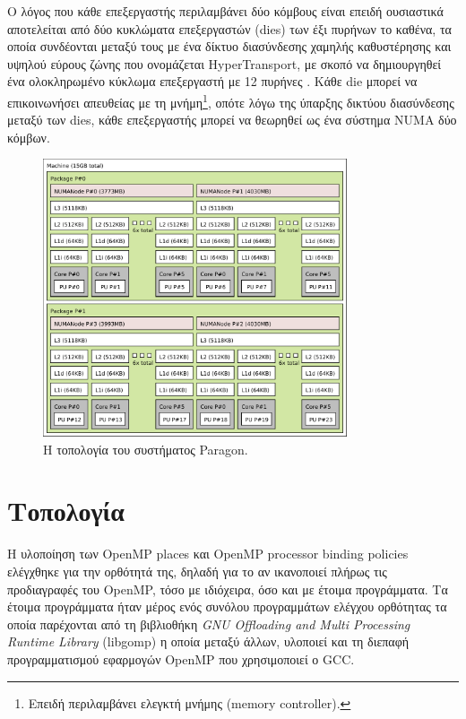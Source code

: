 Ο λόγος που κάθε επεξεργαστής περιλαμβάνει δύο κόμβους είναι επειδή ουσιαστικά αποτελείται από δύο κυκλώματα επεξεργαστών (dies) των έξι πυρήνων το καθένα, τα οποία συνδέονται μεταξύ τους με ένα δίκτυο διασύνδεσης χαμηλής καθυστέρησης και υψηλού εύρους ζώνης που ονομάζεται HyperTransport, με σκοπό να δημιουργηθεί ένα ολοκληρωμένο κύκλωμα επεξεργαστή με 12 πυρήνες \cite{conway2010cache}. Κάθε die μπορεί να επικοινωνήσει απευθείας με τη μνήμη\footnote{Επειδή περιλαμβάνει ελεγκτή μνήμης (memory controller).}, οπότε λόγω της ύπαρξης δικτύου διασύνδεσης μεταξύ των dies, κάθε επεξεργαστής μπορεί να θεωρηθεί ως ένα σύστημα NUMA δύο κόμβων.


\begin{figure}[t]
	\centering
	\includegraphics[width=0.8\textwidth]{Figures/paragon-topo.pdf}
	\linebreak
	\caption{Η τοπολογία του συστήματος Paragon.}
	\label{fig:paragon-topo}
\end{figure}


\section{Τοπολογία}
Η υλοποίηση των OpenMP places και OpenMP processor binding policies ελέγχθηκε για την ορθότητά της, δηλαδή  για το αν ικανοποιεί πλήρως τις προδιαγραφές του OpenMP, τόσο με ιδιόχειρα, όσο και με έτοιμα προγράμματα.   Τα έτοιμα προγράμματα ήταν μέρος ενός συνόλου προγραμμάτων ελέγχου ορθότητας τα οποία παρέχονται από τη βιβλιοθήκη \textit{GNU Offloading and Multi Processing Runtime Library} (libgomp) η οποία μεταξύ άλλων, υλοποιεί και τη διεπαφή προγραμματισμού εφαρμογών OpenMP που χρησιμοποιεί ο GCC.


